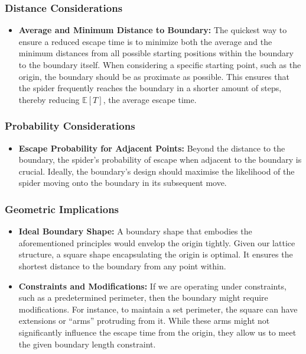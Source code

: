 \documentclass[12pt,a4paper]{article}
\begin{document}
\subsubsection{Distance Considerations}

\begin{itemize}
    \item \textbf{Average and Minimum Distance to Boundary:} The quickest way to ensure a reduced escape time is to minimize both the average and the minimum distances from all possible starting positions within the boundary to the boundary itself. When considering a specific starting point, such as the origin, the boundary should be as proximate as possible. This ensures that the spider frequently reaches the boundary in a shorter amount of steps, thereby reducing \(\mathbb{E}[T]\), the average escape time.
\end{itemize}

\subsubsection{Probability Considerations}

\begin{itemize}
    \item \textbf{Escape Probability for Adjacent Points:} Beyond the distance to the boundary, the spider's probability of escape when adjacent to the boundary is crucial. Ideally, the boundary's design should maximise the likelihood of the spider moving onto the boundary in its subsequent move.
\end{itemize}

\subsubsection{Geometric Implications}

\begin{itemize}
    \item \textbf{Ideal Boundary Shape:} A boundary shape that embodies the aforementioned principles would envelop the origin tightly. Given our lattice structure, a square shape encapsulating the origin is optimal. It ensures the shortest distance to the boundary from any point within.
    
    \item \textbf{Constraints and Modifications:} If we are operating under constraints, such as a predetermined perimeter, then the boundary might require modifications. For instance, to maintain a set perimeter, the square can have extensions or ``arms'' protruding from it. While these arms might not significantly influence the escape time from the origin, they allow us to meet the given boundary length constraint.
\end{itemize}
\end{document}
